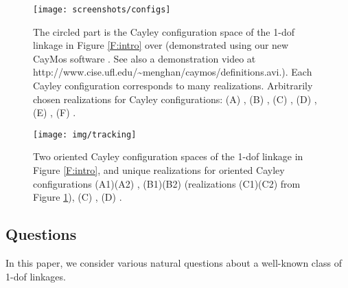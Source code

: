 \documentclass[secthm,amsthm,english]{article}
\theoremstyle{definition}
\theoremstyle{remark}
\begin{document}
\begin{figure}[h]

	\begin{centering}
	\texttt{[image: screenshots/configs]}
	\par\end{centering}
	
	\caption{
	The circled part is the Cayley configuration space of the 1-dof linkage in Figure \ref{F:intro} over  
	(demonstrated using our new CayMos software \protect\cite{bib:caymos}. 
	See also a demonstration video at http://www.cise.ufl.edu/\~{}menghan/caymos/definitions.avi.).  
	Each Cayley configuration corresponds to many realizations. 
	Arbitrarily chosen realizations for Cayley configurations: (A) , (B) , (C) , (D) , (E) , (F) . }

\label{F:interval} 
\end{figure}

\begin{figure}[h]
	
	\begin{centering}
	\texttt{[image: img/tracking]}
	\par\end{centering}
	
	\caption{Two oriented Cayley configuration spaces of the 1-dof linkage in Figure \ref{F:intro}, and   
unique realizations for oriented Cayley configurations (A1)(A2) , (B1)(B2)  (realizations (C1)(C2) from Figure \ref{F:interval}), (C) , (D) . }

\label{F:tracking} 
\end{figure}

\subsection{Questions}
\label{subsec:questions}

In this paper, we consider various natural questions about a well-known class of 1-dof linkages.
\end{document}
